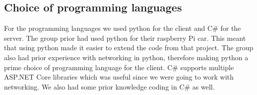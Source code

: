 \subsection{Choice of programming languages}
For the programming languages we used python for the client and C\# for the server. The group prior had used python for their raspberry Pi car. This meant that using python made it easier to extend the code from that project. The group also had prior experience with networking in python, therefore making python a prime choice of programming language for the client. C\# supports multiple ASP.NET Core libraries which was useful since we were going to work with networking.  We also had some prior knowledge coding in C\# as well.